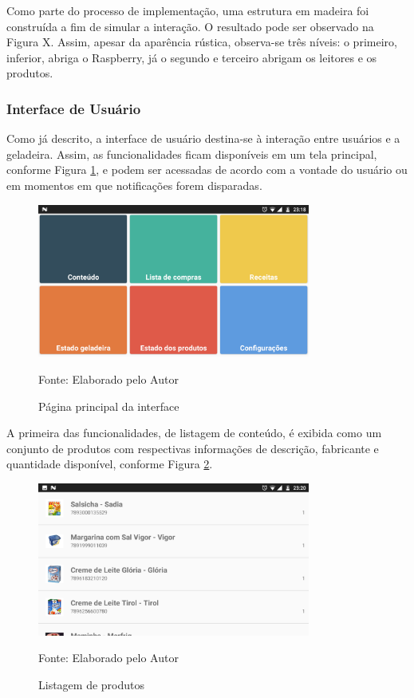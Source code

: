 
Como parte do processo de implementação, uma estrutura em madeira foi construída a fim de simular a interação. O resultado pode ser observado na Figura X. Assim, apesar da aparência rústica, observa-se três níveis: o primeiro, inferior, abriga o Raspberry, já o segundo e terceiro abrigam os leitores e os produtos.


\ProximoForaDoSumario 
\subsubsection{Interface de Usuário}

Como já descrito, a interface de usuário destina-se à interação entre usuários e a geladeira. Assim, as funcionalidades ficam disponíveis em um tela principal, conforme Figura \ref{fig:cap3_app_mainpage}, e podem ser acessadas de acordo com a vontade do usuário ou em momentos em que notificações forem disparadas.

\begin{figure}[htb]
    \caption{Página principal da interface}
    \label{fig:cap3_app_mainpage}
    \includegraphics[width=0.8\textwidth]{figuras/cap4_app_mainpage.png}
    
    \footnotesize{Fonte: Elaborado pelo Autor}
\end{figure}

A primeira das funcionalidades, de listagem de conteúdo, é exibida como um conjunto de produtos com respectivas informações de descrição, fabricante e quantidade disponível, conforme Figura \ref{fig:cap4_listagem_de_produtos}.

\begin{figure}[htb]
    \caption{Listagem de produtos}
    \label{fig:cap4_listagem_de_produtos}
    \includegraphics[width=0.8\textwidth]{figuras/cap4_listagem_de_produtos.png}
    
    \footnotesize{Fonte: Elaborado pelo Autor}
\end{figure}

